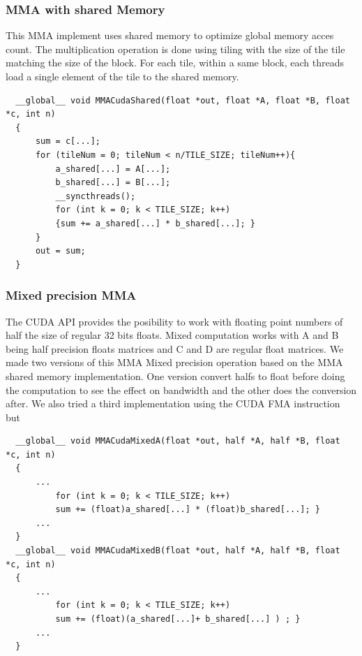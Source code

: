 \documentclass[conference]{IEEEtran}
\begin{document}
  \subsubsection[short]{MMA with shared Memory}
  This MMA implement uses shared memory to optimize global memory acces count. The multiplication operation 
  is done using tiling with the size of the tile matching the size of the block. For each tile, within
  a same block, each threads load a single element of the tile to the shared memory. 
  \begin{lstlisting}
  __global__ void MMACudaShared(float *out, float *A, float *B, float *c, int n)
  {   
      sum = c[...];
      for (tileNum = 0; tileNum < n/TILE_SIZE; tileNum++){
          a_shared[...] = A[...];
          b_shared[...] = B[...];
          __syncthreads();
          for (int k = 0; k < TILE_SIZE; k++)
          {sum += a_shared[...] * b_shared[...]; }
      }
      out = sum;
  }   
  \end{lstlisting}

  \subsubsection[short]{Mixed precision MMA}
  The CUDA API provides the posibility to work with floating point numbers of half the size of regular 32 bits floats.
  Mixed computation works with A and B being half precision floats matrices and C and D are regular float matrices.
  We made two versions of this MMA Mixed precision operation based on the MMA shared memory implementation. One version
  convert halfs to float before doing the computation to see the effect on bandwidth and the other does the conversion after.
  We also tried a third implementation using the CUDA FMA instruction but  
  \begin{lstlisting}
  __global__ void MMACudaMixedA(float *out, half *A, half *B, float *c, int n)
  {   
      ...
          for (int k = 0; k < TILE_SIZE; k++)
          sum += (float)a_shared[...] * (float)b_shared[...]; }
      ...
  }
  __global__ void MMACudaMixedB(float *out, half *A, half *B, float *c, int n)
  {   
      ...
          for (int k = 0; k < TILE_SIZE; k++)
          sum += (float)(a_shared[...]+ b_shared[...] ) ; }
      ...
  }
  \end{lstlisting}
\end{document}
